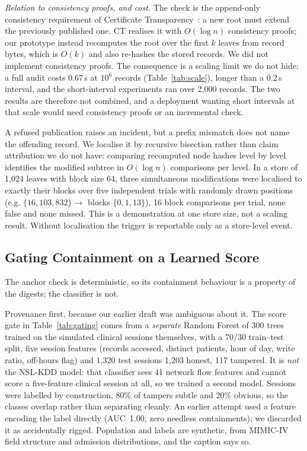 \documentclass[conference]{IEEEtran}
\begin{document}
\emph{Relation to consistency proofs, and cost.} The check is the append-only consistency requirement of
Certificate Transparency~\cite{rfc6962}: a new root must extend the previously published one. CT realises it
with $O(\log n)$ consistency proofs; our prototype instead recomputes the root over the first $k$ leaves from
record bytes, which is $O(k)$ and also re-hashes the stored records. We did not implement consistency proofs.
The consequence is a scaling limit we do not hide: a full audit costs 0.67\,s at $10^6$ records
(Table~\ref{tab:scale}), longer than a 0.2\,s interval, and the short-interval experiments ran over 2{,}000
records. The two results are therefore not combined, and a deployment wanting short intervals at that scale
would need consistency proofs or an incremental check.

A refused publication raises an incident, but a prefix mismatch does not name the offending record. We localise it by recursive bisection rather than claim
attribution we do not have: comparing recomputed node hashes level by level identifies the modified subtree in
$O(\log n)$ comparisons per level. In a store of 1{,}024 leaves with block size 64, three simultaneous
modifications were localised to exactly their blocks over five independent trials with randomly drawn positions
(e.g. $\{16,103,832\}\rightarrow$ blocks $\{0,1,13\}$), 16 block comparisons per trial, none false and none
missed. This is a demonstration at one store size, not a scaling result. Without localisation the trigger is
reportable only as a store-level event.

\subsection{Gating Containment on a Learned Score}
\label{sec:gating}
The anchor check is deterministic, so its containment behaviour is a property of the digests; the
classifier is not.

Provenance first, because our earlier draft was ambiguous about it. The score gate in
Table~\ref{tab:gating} comes from a \emph{separate} Random Forest of 300 trees trained on the simulated
clinical sessions themselves, with a 70/30 train--test split, five session features (records accessed,
distinct patients, hour of day, write ratio, off-hours flag) and 1{,}320 test sessions 1{,}203 honest,
117 tampered. It is \emph{not} the NSL-KDD model: that classifier sees 41 network flow features and cannot
score a five-feature clinical session at all, so we trained a second model. Sessions were labelled by
construction, 80\% of tampers subtle and 20\% obvious, so the classes overlap rather than separating cleanly. An
earlier attempt used a feature encoding the label directly (AUC~1.00, zero needless containments); we discarded
it as accidentally rigged. Population and labels are synthetic, from MIMIC-IV field structure and admission
distributions, and the caption says so.
\end{document}
